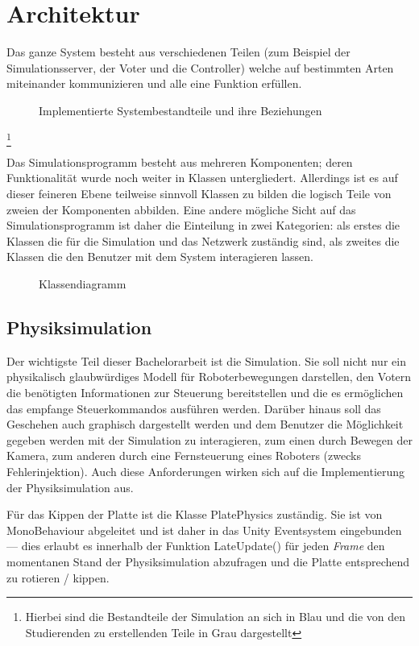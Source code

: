 \clearpage
\section{Architektur}
Das ganze System besteht aus verschiedenen Teilen (zum Beispiel der Simulationsserver, der Voter und die Controller) welche
auf bestimmten Arten miteinander kommunizieren und alle eine Funktion erf{\"{u}}llen.

\begin{figure}
	\centering
	\caption{Implementierte Systembestandteile und ihre Beziehungen}
	\label{fig:arch}
\end{figure}
\footnote{Hierbei sind die Bestandteile der Simulation an sich in Blau und die von den Studierenden zu erstellenden Teile in Grau
dargestellt}


Das Simulationsprogramm besteht aus mehreren Komponenten; deren Funktionalit{\"{a}}t wurde noch weiter in Klassen untergliedert. Allerdings
ist es auf dieser feineren Ebene teilweise sinnvoll Klassen zu bilden die logisch Teile von zweien der Komponenten abbilden. Eine andere
m{\"{o}}gliche Sicht auf das Simulationsprogramm ist daher die Einteilung in zwei Kategorien: als erstes die Klassen die f{\"{u}}r die
Simulation und das Netzwerk zust{\"{a}}ndig sind, als zweites die Klassen die den Benutzer mit dem System interagieren lassen.
\begin{figure}
	\centering
	\caption{Klassendiagramm}
	\label{fig:uml}
\end{figure}

\subsection{Physiksimulation}
Der wichtigste Teil dieser Bachelorarbeit ist die Simulation. Sie soll nicht nur ein physikalisch glaubw{\"{u}}rdiges Modell
f{\"{u}}r Roboterbewegungen darstellen, den Votern die ben{\"{o}}tigten Informationen zur Steuerung bereitstellen und die
es erm{\"{o}}glichen das empfange Steuerkommandos ausf{\"{u}}hren werden. Dar{\"{u}}ber hinaus soll das Geschehen auch graphisch
dargestellt werden und dem Benutzer die M{\"{o}}glichkeit gegeben werden mit der Simulation zu interagieren, zum einen
durch Bewegen der Kamera, zum anderen durch eine Fernsteuerung eines Roboters (zwecks Fehlerinjektion). Auch diese
Anforderungen wirken sich auf die Implementierung der Physiksimulation aus. 

F{\"{u}}r das Kippen der Platte ist die Klasse PlatePhysics zust{\"{a}}ndig. Sie ist von MonoBehaviour abgeleitet und ist daher
in das Unity Eventsystem eingebunden --- dies erlaubt es innerhalb der Funktion LateUpdate() f{\"{u}}r jeden \textit{\gls{Frame}} den momentanen
Stand der Physiksimulation abzufragen und die Platte entsprechend zu rotieren / kippen.


